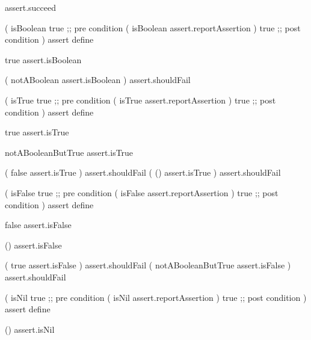 \startJoylolTest
assert.succeed
\stopJoylolTest
\stopTestCase
\stopTestSuite

\startJoylolCode
(
  isBoolean
  { true } ;; pre condition
  (
    isBoolean
    assert.reportAssertion
  )
  { true } ;; post condition
)
assert
define
\stopJoylolCode

\startJoylolTest
true
assert.isBoolean
\stopJoylolTest
\stopTestCase

\startJoylolTest
(
  notABoolean
  assert.isBoolean
) assert.shouldFail
\stopJoylolTest
\stopTestCase
\stopTestSuite


\startJoylolCode
(
  isTrue
  { true } ;; pre condition
  (
    isTrue
    assert.reportAssertion
  )
  { true } ;; post condition
)
assert
define
\stopJoylolCode

\startJoylolTest
true
assert.isTrue

notABooleanButTrue
assert.isTrue
\stopJoylolTest
\stopTestCase

\startJoylolTest
(
  false
  assert.isTrue 
) assert.shouldFail
(
  ()
  assert.isTrue
) assert.shouldFail
\stopJoylolTest
\stopTestCase
\stopTestSuite


\startJoylolCode
(
  isFalse
  { true } ;; pre condition
  (
    isFalse
    assert.reportAssertion
  )
  { true } ;; post condition
)
assert
define
\stopJoylolCode

\startJoylolTest
false
assert.isFalse

()
assert.isFalse
\stopJoylolTest
\stopTestCase

\startJoylolTest
(
  true
  assert.isFalse
) assert.shouldFail
(
  notABooleanButTrue
  assert.isFalse
) assert.shouldFail
\stopJoylolTest
\stopTestCase
\stopTestSuite


\startJoylolCode
(
  isNil
  { true } ;; pre condition
  (
    isNil
    assert.reportAssertion
  )
  { true } ;; post condition
)
assert
define
\stopJoylolCode

\startJoylolTest
()
assert.isNil
\stopJoylolTest
\stopTestCase

